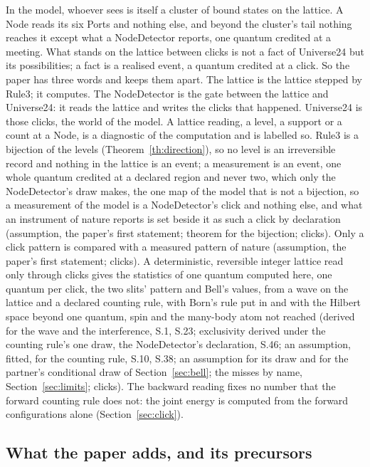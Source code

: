 \documentclass[pdflatex,sn-mathphys-num]{sn-jnl}
\theoremstyle{thmstyleone}
\theoremstyle{thmstyletwo}
\begin{document}
\label{sec:whyclicks}In the model, whoever sees is itself a cluster of bound states on the lattice. A Node reads its six Ports and nothing else, and beyond the cluster's tail nothing reaches it except what a NodeDetector reports, one quantum credited at a meeting. What stands on the lattice between clicks is not a fact of Universe24 but its possibilities; a fact is a realised event, a quantum credited at a click. So the paper has three words and keeps them apart. The lattice is the lattice stepped by Rule3; it computes. The NodeDetector is the gate between the lattice and Universe24: it reads the lattice and writes the clicks that happened. Universe24 is those clicks, the world of the model. A lattice reading, a level, a support or a count at a Node, is a diagnostic of the computation and is labelled so. Rule3 is a bijection of the levels (Theorem~\ref{th:direction}), so no level is an irreversible record and nothing in the lattice is an event; a measurement is an event, one whole quantum credited at a declared region and never two, which only the NodeDetector's draw makes, the one map of the model that is not a bijection, so a measurement of the model is a NodeDetector's click and nothing else, and what an instrument of nature reports is set beside it as such a click by declaration (assumption, the paper's first statement; theorem for the bijection; clicks). Only a click pattern is compared with a measured pattern of nature (assumption, the paper's first statement; clicks). A deterministic, reversible integer lattice read only through clicks gives the statistics of one quantum computed here, one quantum per click, the two slits' pattern and Bell's values, from a wave on the lattice and a declared counting rule, with Born's rule put in and with the Hilbert space beyond one quantum, spin and the many-body atom not reached (derived for the wave and the interference, S.1, S.23; exclusivity derived under the counting rule's one draw, the NodeDetector's declaration, S.46; an assumption, fitted, for the counting rule, S.10, S.38; an assumption for its draw and for the partner's conditional draw of Section~\ref{sec:bell}; the misses by name, Section~\ref{sec:limits}; clicks). The backward reading fixes no number that the forward counting rule does not: the joint energy is computed from the forward configurations alone (Section~\ref{sec:click}).

\subsection{What the paper adds, and its precursors}\label{sec:adds}
\end{document}
